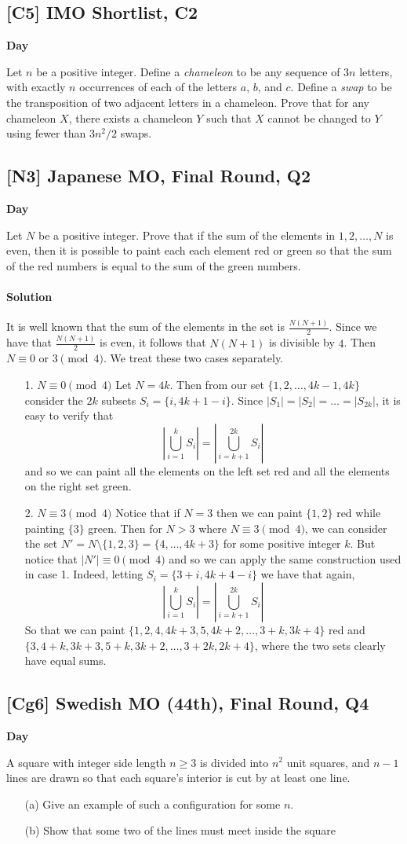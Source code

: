 \documentclass[10pt]{article}
\newcommand{\themonth}{March}
\newcommand{\theyear}{2019}
\newcounter{day}
\newcounter{solution}
\newcounter{datenumber}
\newcommand{\problem}[4][0]{
	\newpage
	\subsection{[#3] \space #2} \hfill 
	{\large\textbf{Day \arabic{day}}} %
	\begin{flushleft} #4 \end{flushleft}
	\vspace{1em}
	\addtocounter{day}{1}
	\addtocounter{datenumber}{1}
	\setcounter{solution}{1}
}
\newcommand{\anonsolution}[2][0]{
	\paragraph{Solution \arabic{solution}} 
	\begin{flushleft} #2 \end{flushleft}
	\addtocounter{solution}{1}
	\vspace{1em}
}
\begin{document}
\problem[20]{2018 IMO Shortlist, C2}{C5}{Let $n$ be a positive integer. Define a \emph{chameleon} to be any sequence of $3n$ letters, with exactly $n$ occurrences of each of the letters $a$, $b$, and $c$. Define a \emph{swap} to be the transposition of two adjacent letters in a chameleon. Prove that for any chameleon $X$, there exists a chameleon $Y$ such that $X$ cannot be changed to $Y$ using fewer than $3n^2/2$ swaps.}

\problem[21]{2009 Japanese MO, Final Round, Q2}{N3}{Let $N$ be a positive integer. Prove that if the sum of the elements in ${1,2,\dots,N}$ is even, then it is possible to paint each each element red or green so that the sum of the red numbers is equal to the sum of the green numbers.}

\anonsolution[21]{It is well known that the sum of the elements in the set is \(\frac{N(N+1)}{2}\). Since we have that \(\frac{N(N+1)}{2}\) is even, it follows that \(N(N+1)\) is divisible by \(4\). Then  \(N\equiv 0\) or \(3\pmod 4\). We treat these two cases separately. 
	\begin{enumerate}
		\item[1. \(N\equiv 0\pmod 4\)] Let \(N=4k\). Then from our set \(\{1,2,\dots, 4k-1, 4k\}\) consider the \(2k\) subsets \(S_i=\{i,4k+1-i\}. \) Since \(|S_1|=|S_2|=\dots = |S_{2k}|\), it is easy to verify that \[\left|\bigcup_{i=1}^k S_i\right|=\left|\bigcup_{i=k+1}^{2k} S_i\right|\] and so we can paint all the elements on the left set red and all the elements on the right set green.
		\item[2.  \(N\equiv 3 \pmod 4\)] Notice that if \(N=3\) then we can paint \(\{1,2\}\) red while painting \(\{3\}\) green. Then for \(N>3\) where \(N\equiv 3\pmod 4\), we can consider the set \(N'=N\setminus \{1,2,3\}=\{4,\dots, 4k+3\}\) for some positive integer \(k\). But notice that \(|N'|\equiv 0\pmod 4\) and so we can apply the same construction used in case 1. Indeed, letting \(S_i=\{3+i,4k+4-i\}\) we have that again, \[\left|\bigcup_{i=1}^k S_i\right|=\left|\bigcup_{i=k+1}^{2k} S_i\right|\] So that we can paint \(\{1,2,4,4k+3,5,4k+2,\dots, 3+k, 3k+4\}\) red and \(\{3,4+k,3k+3, 5+k, 3k+2,\dots, 3+2k, 2k+4\}\), where the two sets clearly have equal sums.
\end{enumerate}}

\problem[22]{2004 Swedish MO (44th), Final Round, Q4}{Cg6}{A square with integer side length $n \geq 3$ is divided into $n^2$ unit squares, and $n-1$ lines are drawn so that each square's interior is cut by at least one line. \begin{enumerate} \item[(a)] Give an example of such a configuration for some $n$. \item[(b)] Show that some two of the lines must meet inside the square \end{enumerate}}
\end{document}
